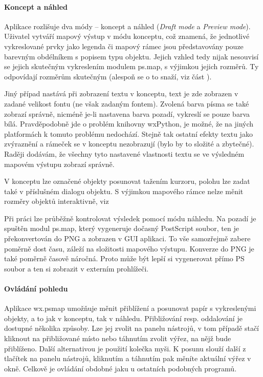\documentclass[a4paper,12pt,draft]{article}
\begin{document}
{\paragraph*{Koncept a náhled}
Aplikace rozlišuje dva módy -- koncept a náhled (\emph{Draft mode}
a \emph{Preview mode}).
Uživatel vytváří mapový výstup v módu konceptu, což znamená,
že jednotlivé vykreslované prvky jako legenda či mapový rámec jsou
představovány pouze barevným obdélníkem s popisem typu objektu. Jejich
vzhled tedy nijak nesouvisí se jejich skutečným vykreslením modulem
ps.map, s výjimkou jejich rozměrů. Ty odpovídají rozměrům
skutečným (alespoň se o to snaží, viz část ).

Jiný případ nastává při zobrazení textu v konceptu, text je zde
zobrazen v zadané velikost fontu (ne však zadaným fontem). Zvolená
barva písma se také zobrazí správně, nicméně je-li nastavena barva
pozadí, vykreslí se pouze barva bílá. Pravděpodobně jde o problém
knihovny wxPython, je možné, že na jiných platformách k tomuto problému
nedochází. Stejně tak ostatní efekty textu jako zvýraznění a rámeček
se v konceptu nezobrazují (bylo by to složité a zbytečné). Raději
dodávám, že všechny tyto nastavené vlastnosti textu se ve výsledném
mapovém výstupu zobrazí správně.

V konceptu lze označené objekty posunovat tažením kurzoru, polohu lze
zadat také v příslušném dialogu objektu. S výjimkou mapového rámce
nelze měnit rozměry objektů interaktivně, viz 

Při práci lze průběžně kontrolovat výsledek pomocí módu náhledu. Na
pozadí je spuštěn modul ps.map, který vygeneruje dočasný
PostScript soubor, ten je překonvertován do PNG a zobrazen v GUI
aplikaci. To vše samozřejmě zabere poměrně dost času, záleží na
složitosti mapového výstupu. Konverze do PNG je také poměrně časově
náročná. Proto může být lepší si vygenerovat přímo PS soubor a
ten si zobrazit v externím prohlížeči.

\paragraph*{Ovládání pohledu}
Aplikace wx.psmap umožňuje měnit přiblížení a posunovat papír s
vykreslenými objekty, a to jak v konceptu, tak v náhledu. Přibližování
resp. oddalování je dostupné několika způsoby. Lze jej zvolit na panelu
nástrojů, v tom případě stačí kliknout na přibližované místo nebo
táhnutím zvolit výřez, na nějž bude přiblíženo. Další alternativou
je použití kolečka myši. K posunu slouží další z tlačítek na
panelu nástrojů, kliknutím a táhnutím pak měníte aktuální výřez v
okně. Celkově je ovládání obdobné jaku u ostatních podobných programů.

}
\end{document}
